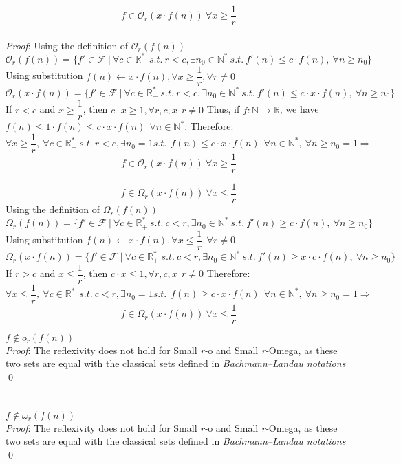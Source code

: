  
 \[ f \in \mathcal{O}_{r} \left( x \cdot f(n) \right)\ \forall x \geq \dfrac{1}{r} \]
   \\\textit{Proof}:
    Using the definition of $ \mathcal{O}_{r}(f(n))$
  \[\mathcal{O}_{r}(f(n)) = \lbrace f' \in \mathcal{F}\ |\ \forall c  \in \mathbb{R}^{*}_{+} \ s.t.\  r<c, \exists n_{0} \in \mathbb{N}^{*}\ s.t.\  f'(n) \leq c \cdot f(n),\  \forall n \geq n_{0} \rbrace\]
    Using substitution $ f(n) \longleftarrow x \cdot f(n), \forall x \geq \dfrac{1}{r}, \forall r \neq 0$
  \[\mathcal{O}_{r}(x \cdot f(n)) = \lbrace f' \in \mathcal{F}\ |\ \forall c  \in \mathbb{R}^{*}_{+} \ s.t.\  r<c, \exists n_{0} \in \mathbb{N}^{*}\ s.t.\  f'(n) \leq c \cdot x \cdot f(n),\  \forall n \geq n_{0} \rbrace\]
If $r<c$ and $x \geq \dfrac{1}{r}$, then $c \cdot x \geq 1, \forall r,c,x\ \ r \neq 0$
   	Thus, if $f:\mathbb{N}\longrightarrow\mathbb{R}$, we have $ f(n) \leq 1 \cdot f(n) \leq  c \cdot x\cdot f(n) \ \ \forall n \in \mathbb{N}^{*}$. 
   	Therefore:
   	\[\forall x \geq \dfrac{1}{r}, \ \forall c \in \mathbb{R}^{*}_{+} \ s.t.\  r<c , \exists n_{0} = 1  s.t.\  \  f(n) \leq  c \cdot x\cdot f(n) \ \ \forall n \in \mathbb{N}^{*} ,\  \forall n \geq n_{0}=1 \Rightarrow \]
 \[ f \in \mathcal{O}_{r} \left( x \cdot f(n) \right)\ \forall x \geq \dfrac{1}{r} \]
\qedsymbol

 \[ f \in \Omega_{r} \left( x \cdot f(n) \right)\ \forall x \leq \dfrac{1}{r} \]
    Using the definition of $\Omega_{r}(f(n))$
  \[\Omega_{r}(f(n)) = \lbrace f' \in \mathcal{F}\ |\ \forall c  \in \mathbb{R}^{*}_{+} \ s.t.\  c<r, \exists n_{0} \in \mathbb{N}^{*}\ s.t.\  f'(n) \geq c \cdot f(n),\  \forall n \geq n_{0} \rbrace\]
    Using substitution $ f(n) \longleftarrow x \cdot f(n), \forall x \leq \dfrac{1}{r}, \forall r \neq 0$
  \[\Omega_{r}(x \cdot f(n)) = \lbrace f' \in \mathcal{F}\ |\ \forall c  \in \mathbb{R}^{*}_{+} \ s.t.\  c<r, \exists n_{0} \in \mathbb{N}^{*}\ s.t.\  f'(n) \geq x \cdot c \cdot f(n),\  \forall n \geq n_{0} \rbrace\]
If $r>c$ and $x \leq \dfrac{1}{r}$, then $c \cdot x \leq 1, \forall r,c,x\ \ r \neq 0$
   	Therefore:
   	\[\forall x \leq \dfrac{1}{r}, \ \forall c \in \mathbb{R}^{*}_{+} \ s.t.\  c<r , \exists n_{0} = 1  s.t.\  \  f(n) \geq  c \cdot x\cdot f(n) \ \ \forall n \in \mathbb{N}^{*} ,\  \forall n \geq n_{0}=1 \Rightarrow \]
 \[ f \in \Omega_{r} \left( x \cdot f(n) \right)\ \forall x \leq \dfrac{1}{r} \]
\qedsymbol


 
$ f \notin o_{r}(f(n)) $
\\\textit{Proof}:
The reflexivity does not hold for Small \textit{r-}o and Small \textit{r-}Omega, as these two sets are equal with the classical sets defined in \textit{Bachmann–Landau notations}
\qed
 \\ \\ \\ $ f \notin \omega_{r}(f(n)) $ 
 \\\textit{Proof}:
The reflexivity does not hold for Small \textit{r-}o and Small \textit{r-}Omega, as these two sets are equal with the classical sets defined in \textit{Bachmann–Landau notations}
\qed
 \hfill\break

